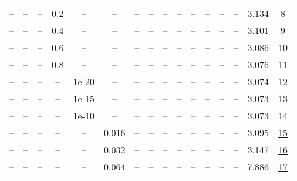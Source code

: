 \begin{table}[H]
\begin{tabular}{cccccccccccccccc}
-- & -- & -- & 0.2 & -- & -- & -- & -- & -- & -- & -- & -- & -- & -- & 3.134 & \href{https://wandb.ai/stanford-mercury/optimizer-scaling/runs/sweep-520m-10B-muon7bf1dalr0.008-wd0.1-minlr0-warmup0-b10.8-b20.-0591da}{8} \\
-- & -- & -- & 0.4 & -- & -- & -- & -- & -- & -- & -- & -- & -- & -- & 3.101 & \href{https://wandb.ai/stanford-mercury/optimizer-scaling/runs/sweep-520m-10B-muon38778flr0.008-wd0.1-minlr0-warmup0-b10.8-b20.-a2dc9e}{9} \\
-- & -- & -- & 0.6 & -- & -- & -- & -- & -- & -- & -- & -- & -- & -- & 3.086 & \href{https://wandb.ai/stanford-mercury/optimizer-scaling/runs/sweep-520m-10B-muon8eb81clr0.008-wd0.1-minlr0-warmup0-b10.8-b20.-35dedc}{10} \\
-- & -- & -- & 0.8 & -- & -- & -- & -- & -- & -- & -- & -- & -- & -- & 3.076 & \href{https://wandb.ai/stanford-mercury/optimizer-scaling/runs/sweep-520m-10B-muon3d94a7lr0.008-wd0.1-minlr0-warmup0-b10.8-b20.-636a88}{11} \\
-- & -- & -- & -- & 1e-20 & -- & -- & -- & -- & -- & -- & -- & -- & -- & 3.074 & \href{https://wandb.ai/stanford-mercury/optimizer-scaling/runs/sweep-520m-10B-muonfc4dd7lr0.008-wd0.1-minlr0-warmup0-b10.8-b20.-fa6779}{12} \\
-- & -- & -- & -- & 1e-15 & -- & -- & -- & -- & -- & -- & -- & -- & -- & 3.073 & \href{https://wandb.ai/stanford-mercury/optimizer-scaling/runs/sweep-520m-10B-muon284dcblr0.008-wd0.1-minlr0-warmup0-b10.8-b20.-913bb6}{13} \\
-- & -- & -- & -- & 1e-10 & -- & -- & -- & -- & -- & -- & -- & -- & -- & 3.073 & \href{https://wandb.ai/stanford-mercury/optimizer-scaling/runs/sweep-520m-10B-muonc71f70lr0.008-wd0.1-minlr0-warmup0-b10.8-b20.-634a5c}{14} \\
-- & -- & -- & -- & -- & 0.016 & -- & -- & -- & -- & -- & -- & -- & -- & 3.095 & \href{https://wandb.ai/stanford-mercury/optimizer-scaling/runs/sweep-520m-10B-muon2ead91lr0.016-wd0.1-minlr0-warmup0-b10.8-b20.-d03e40}{15} \\
-- & -- & -- & -- & -- & 0.032 & -- & -- & -- & -- & -- & -- & -- & -- & 3.147 & \href{https://wandb.ai/stanford-mercury/optimizer-scaling/runs/sweep-520m-10B-muonf91fealr0.032-wd0.1-minlr0-warmup0-b10.8-b20.-531812}{16} \\
-- & -- & -- & -- & -- & 0.064 & -- & -- & -- & -- & -- & -- & -- & -- & 7.886 & \href{https://wandb.ai/stanford-mercury/optimizer-scaling/runs/sweep-520m-10B-muond9755blr0.064-wd0.1-minlr0-warmup0-b10.8-b20.-46abb1}{17} \\

\end{tabular}
\end{table}
